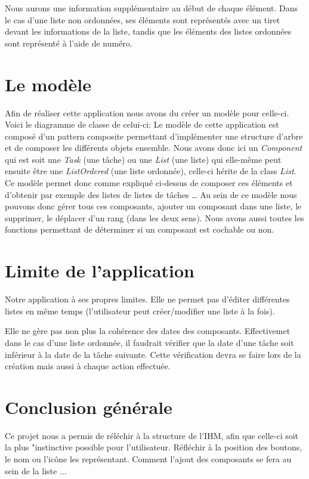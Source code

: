 \documentclass[a4paper,10pt]{article}
\begin{document}
Nous aurons une information supplémentaire au début de chaque élément. Dans le cas d'une liste non ordonnées, ses éléments sont représentés avec un tiret devant les informations de la liste, tandis que les éléments des listes ordonnées sont représenté à l'aide de numéro.

\newpage
\section{Le modèle}
Afin de réaliser cette application nous avons du créer un modèle pour celle-ci. Voici le diagramme de classe de celui-ci:
Le modèle de cette application est composé d'un pattern composite permettant d'implémenter une structure d'arbre et de composer les différents objets ensemble. Nous avons donc ici un \textit{Component} qui est soit une \textit{Task} (une tâche) ou une \textit{List} (une liste) qui elle-même peut ensuite être une \textit{ListOrdered} (une liste ordonnée), celle-ci hérite de la class \textit{List}. Ce modèle permet donc comme expliqué ci-dessus de composer ces éléments et d'obtenir par exemple des listes de listes de tâches \dots 
Au sein de ce modèle nous pouvons donc gérer tous ces composants, ajouter un composant dans une liste, le supprimer, le déplacer d'un rang (dans les deux sens). Nous avons aussi toutes les fonctions permettant de déterminer si un composant est cochable ou non.

\newpage
\section{Limite de l'application}
Notre application à ses propres limites. Elle ne permet pas d'éditer différentes listes en même temps (l'utilisateur peut créer/modifier une liste à la fois).

Elle ne gère pas non plus la cohérence des dates des composants. Effectivemet dans le cas d'une liste ordonnée, il faudrait vérifier que la date d'une tâche soit inférieur à la date de la tâche suivante. Cette vérification devra se faire lors de la création mais aussi à chaque action effectuée.

\newpage
\section{Conclusion générale}
Ce projet nous a permis de réléchir à la structure de l'IHM, afin que celle-ci soit la plus "instinctive %
possible pour l'utilisateur. Réfléchir à la position des boutons, le nom ou l'icône les représentant. Comment l'ajout des composants se fera au sein de la liste ...
\end{document}
